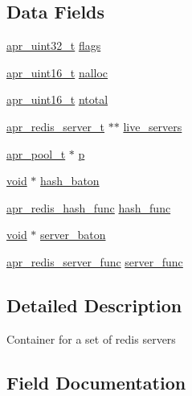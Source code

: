 \subsection*{Data Fields}
\begin{DoxyCompactItemize}
\item 
\hyperlink{group__apr__platform_ga558548a135d8a816c4787250744ea147}{apr\+\_\+uint32\+\_\+t} \hyperlink{structapr__redis__t_a44f8ff80214f13e7a0269148d12a3a77}{flags}
\item 
\hyperlink{group__apr__platform_ga3fb87c977e28a526d872d1081411b129}{apr\+\_\+uint16\+\_\+t} \hyperlink{structapr__redis__t_a122b4eade155c406fff5df91491dfc08}{nalloc}
\item 
\hyperlink{group__apr__platform_ga3fb87c977e28a526d872d1081411b129}{apr\+\_\+uint16\+\_\+t} \hyperlink{structapr__redis__t_a75200230ca97f0c21e20e99be4aa08d4}{ntotal}
\item 
\hyperlink{structapr__redis__server__t}{apr\+\_\+redis\+\_\+server\+\_\+t} $\ast$$\ast$ \hyperlink{structapr__redis__t_aa3b810c038c9c968da250effe76d76fb}{live\+\_\+servers}
\item 
\hyperlink{structapr__pool__t}{apr\+\_\+pool\+\_\+t} $\ast$ \hyperlink{structapr__redis__t_a5384cf2f759115eb0056edb3aebed90f}{p}
\item 
\hyperlink{group__MOD__ISAPI_gacd6cdbf73df3d9eed42fa493d9b621a6}{void} $\ast$ \hyperlink{structapr__redis__t_a0a7deec81f809adcc5f4b318475bb789}{hash\+\_\+baton}
\item 
\hyperlink{group__APR__Util__RC_ga2f0c5b75879b3ba94f89bc8e68528bb1}{apr\+\_\+redis\+\_\+hash\+\_\+func} \hyperlink{structapr__redis__t_a7aa485089c067ca8f715a830ad0dfba8}{hash\+\_\+func}
\item 
\hyperlink{group__MOD__ISAPI_gacd6cdbf73df3d9eed42fa493d9b621a6}{void} $\ast$ \hyperlink{structapr__redis__t_a25c19a3b4bf0774c7654aa17d52824ff}{server\+\_\+baton}
\item 
\hyperlink{group__APR__Util__RC_ga7f2fc18eb8f02ba970d7a8bfde2b048c}{apr\+\_\+redis\+\_\+server\+\_\+func} \hyperlink{structapr__redis__t_a8d4932d4a1a858ce74430ad41951ee41}{server\+\_\+func}
\end{DoxyCompactItemize}


\subsection{Detailed Description}
Container for a set of redis servers 

\subsection{Field Documentation}
